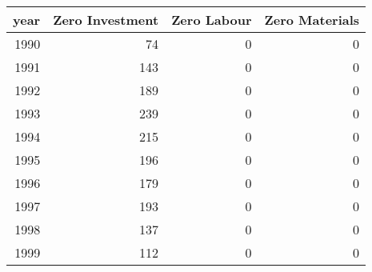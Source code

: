 \begin{tabular}{rrrr}
  \hline
  \textbf{year} & \textbf{Zero Investment} & \textbf{Zero Labour} & \textbf{Zero Materials} \\
 \hline
  1990 & 74 & 0 & 0 \\
  1991 & 143 & 0 & 0 \\
  1992 & 189 & 0 & 0 \\
  1993 & 239 & 0 & 0 \\
  1994 & 215 & 0 & 0 \\
  1995 & 196 & 0 & 0 \\
  1996 & 179 & 0 & 0 \\
  1997 & 193 & 0 & 0 \\
  1998 & 137 & 0 & 0 \\
  1999 & 112 & 0 & 0 \\\hline
\end{tabular}
